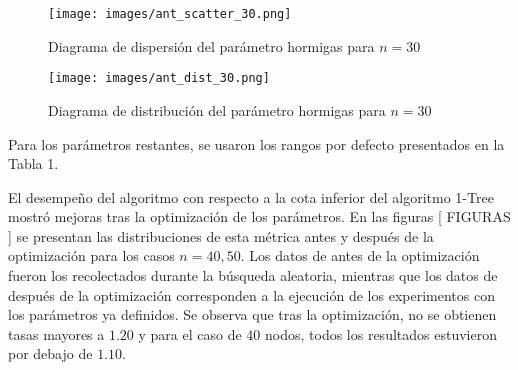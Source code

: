 \documentclass[conference]{IEEEtran}
\begin{document}
    \begin{figure}[htbp]
      \centering
      \begin{minipage}[t]{0.45\linewidth}
        \centering
        \texttt{[image: images/ant\_scatter\_30.png]}
        \caption{Diagrama de dispersión del parámetro hormigas para $n=30$}
        \label{fig:image29}
      \end{minipage}
      \hfill
      \begin{minipage}[t]{0.45\linewidth}
        \centering
        \texttt{[image: images/ant\_dist\_30.png]}
        \caption{Diagrama de distribución del parámetro hormigas para $n=30$}
        \label{fig:image30}
      \end{minipage}
    \end{figure}
Para los parámetros restantes, se usaron los rangos por defecto presentados en la Tabla 1.
\begin{table}[h]
\centering
{}
\caption{Detalles de parámetros}
\label{tab:table3}
\end{table}
El desempeño del algoritmo con respecto a la cota inferior del algoritmo 1-Tree mostró mejoras tras la optimización de los parámetros. En las figuras [ FIGURAS ] se presentan las distribuciones de esta métrica antes y después de la optimización para los casos $n=40, 50$. Los datos de antes de la optimización fueron los recolectados durante la búsqueda aleatoria, mientras que los datos de después de la optimización corresponden a la ejecución de los experimentos con los parámetros ya definidos. Se observa que tras la optimización, no se obtienen tasas mayores a $1.20$ y para el caso de $40$ nodos, todos los resultados estuvieron por debajo de $1.10$.
\end{document}
